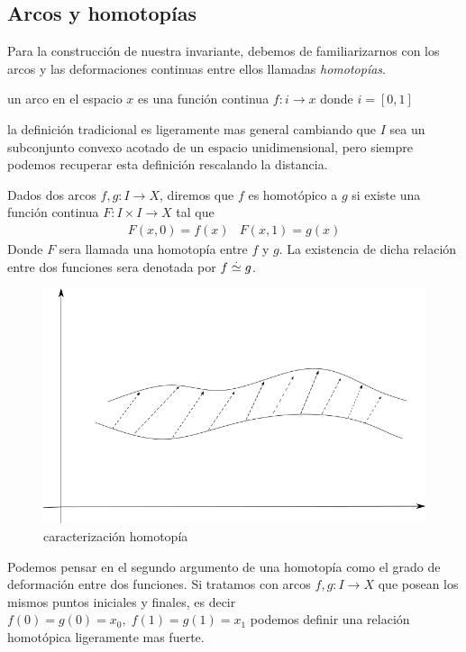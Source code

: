 \subsection{Arcos y homotopías}
Para la construcción de nuestra invariante, debemos de familiarizarnos
con los arcos y las deformaciones continuas entre ellos llamadas
\emph{homotopías}.

\begin{definicion}[arco]
  un arco en el espacio \(x\) es una función continua \(f : i \to x \)
  donde \(i = [0,1]\)
\end{definicion}
la definición tradicional es ligeramente mas general cambiando que \(I\)
sea un subconjunto convexo acotado de un espacio unidimensional, pero
siempre podemos recuperar esta definición rescalando la distancia.

\begin{definicion}[Homotopia]
  Dados dos arcos \(f,g : I \to X\), diremos que \(f\) es homotópico a
  \(g\) si existe una función continua \(F : I \times I \to X \) tal que
  \[ \begin{matrix}
      F (x, 0) = f(x) & F (x, 1) = g(x)
     \end{matrix}
  \]
  Donde \(F\) sera llamada una homotopía entre \(f\) y \(g\). La
  existencia de dicha relación entre dos funciones sera denotada por \(f
  \stackrel{.}{\simeq} g\).
\end{definicion}
\begin{figure}[h]
  \centering
  \includegraphics[scale=0.3]{./imagenes/homotopia.png}
  \caption{caracterización homotopía}
  \label{fig:homotopia-entre-funciones}
\end{figure}
Podemos pensar en el segundo argumento de una homotopía como el grado de
deformación entre dos funciones.
Si tratamos con arcos \(f,g : I \to X\) que posean los mismos puntos
iniciales y finales, es decir \(f(0) = g(0) = x_0, \; f(1) = g(1) =
x_1 \) podemos definir una relación homotópica ligeramente mas fuerte.

